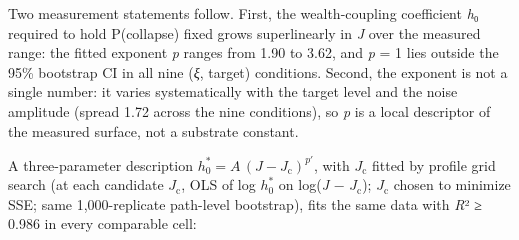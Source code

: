 \documentclass[11pt,letterpaper]{article}
\begin{document}
Two measurement statements follow. First, the wealth-coupling coefficient \emph{h}₀ required to hold P(collapse) fixed grows superlinearly in \emph{J} over the measured range: the fitted exponent \emph{p} ranges from 1.90 to 3.62, and \emph{p} = 1 lies outside the 95\% bootstrap CI in all nine (\emph{ξ}, target) conditions. Second, the exponent is not a single number: it varies systematically with the target level and the noise amplitude (spread 1.72 across the nine conditions), so \emph{p} is a local descriptor of the measured surface, not a substrate constant.

A three-parameter description \(h_0^* = A\,(J - J_{\mathrm{c}})^{p'}\), with \(J_{\mathrm{c}}\) fitted by profile grid search (at each candidate \(J_{\mathrm{c}}\), OLS of log \(h_0^*\) on log(\emph{J} − \(J_{\mathrm{c}}\)); \(J_{\mathrm{c}}\) chosen to minimize SSE; same 1,000-replicate path-level bootstrap), fits the same data with \emph{R}² ≥ 0.986 in every comparable cell:
\end{document}
